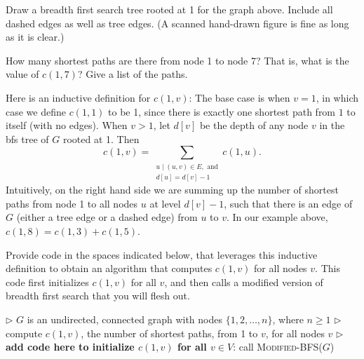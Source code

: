 \documentclass[11pt,fleqn]{exam}
\begin{document}
\begin{questions}
\question[2]
Draw a breadth first search tree rooted at 1 for the graph above. Include all dashed edges as well as tree edges. (A scanned hand-drawn figure is fine as long as it is clear.)

\question[2]
How many shortest paths are there from node 1 to node 7? That is, what is the value of $c(1,7)$? Give a list of the paths.

\question[4]
\label{counting-alg}
Here is an inductive definition for $c(1,v)$: The base case is when $v=1$, in which case we define $c(1,1)$ to be 1, since there is exactly one shortest path from $1$ to itself (with no edges). When $v > 1$, let $d[v]$ be the depth of any node $v$ in the bfs tree of $G$ rooted at 1. Then
\[
c(1,v) = \sum_{\begin{array}{l}u \;|\; (u,v) \in E, \mbox{ and} \\ d[u] = d[v] - 1\end{array}} c(1,u).
\]
Intuitively, on the right hand side we are summing up the number of shortest paths from node 1 to all nodes $u$ at level $d[v]-1$, such that there is an edge of $G$ (either a tree edge or a dashed edge) from $u$ to $v$. In our example above, $c(1,8) = c(1,3) + c(1,5)$.

Provide code in the spaces indicated below, that leverages this inductive definition to obtain an algorithm that computes $c(1,v)$ for all nodes $v$. This code first initializes $c(1,v)$ for all $v$, and then calls a modified version of breadth first search that you will flesh out.

\clearpage

\begin{algorithmic}
    \State $\triangleright$ $G$ is an undirected, connected graph with nodes $\{1,2,\ldots,n\}$, where $n \ge 1$
    \State $\triangleright$ compute $c(1,v)$, the number of shortest paths, from 1 to $v$, for all nodes $v$
     \State $\triangleright$ {\bf add code here to initialize $c(1,v)$ for all $v \in V$}:
     \State
     \State
     \State
       \State call \textsc{Modified-BFS}($G$)
\EndProcedure
\end{algorithmic}

\vspace{.1in}


\end{questions}
\end{document}
